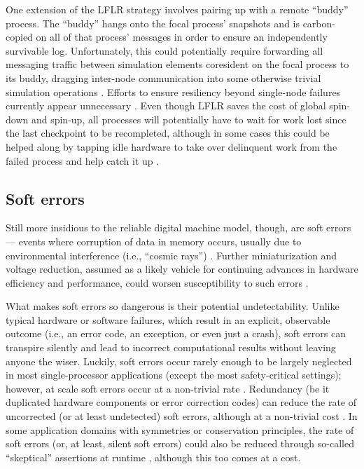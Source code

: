 One extension of the LFLR strategy involves pairing up with a remote ``buddy'' process.
The ``buddy'' hangs onto the focal process' snapshots and is carbon-copied on all of that process' messages in order to ensure an independently survivable log.
Unfortunately, this could potentially require forwarding all messaging traffic between simulation elements coresident on the focal process to its buddy, dragging inter-node communication into some otherwise trivial simulation operations \cite{chakravorty2007fault}.
Efforts to ensure resiliency beyond single-node failures currently appear unnecessary \cite[p. 12]{ni2016mitigation}.
Even though LFLR saves the cost of global spin-down and spin-up, all processes will potentially have to wait for work lost since the last checkpoint to be recompleted, although in some cases this could be helped along by tapping idle hardware to take over delinquent work from the failed process and help catch it up \cite{dongarra2014applied}.

\subsection{Soft errors}

Still more insidious to the reliable digital machine model, though, are soft errors --- events where corruption of data in memory occurs, usually due to environmental interference (i.e., ``cosmic rays'') \cite{karnik2004characterization}.
Further miniaturization and voltage reduction, assumed as a likely vehicle for continuing advances in hardware efficiency and performance, could worsen susceptibility to such errors \cite{dongarra2014applied,kajmakovic2020challenges}.

What makes soft errors so dangerous is their potential undetectability.
Unlike typical hardware or software failures, which result in an explicit, observable outcome (i.e., an error code, an exception, or even just a crash), soft errors can transpire silently and lead to incorrect computational results without leaving anyone the wiser.
Luckily, soft errors occur rarely enough to be largely neglected in most single-processor applications (except the most safety-critical settings); however, at scale soft errors occur at a non-trivial rate \cite{sridharan2015memory,scoles2018cosmic}.
Redundancy (be it duplicated hardware components or error correction codes) can reduce the rate of uncorrected (or at least undetected) soft errors, although at a non-trivial cost \cite{vankeirsbilck2015soft,sridharan2015memory}.
In some application domains with symmetries or conservation principles, the rate of soft errors (or, at least, silent soft errors) could also be reduced through so-called ``skeptical'' assertions at runtime \cite{dongarra2014applied}, although this too comes at a cost.
